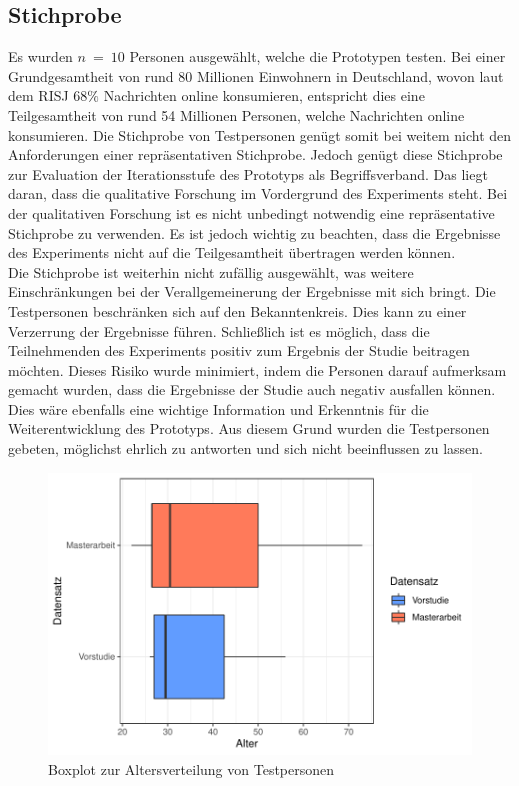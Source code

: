 \subsection{Stichprobe}
Es wurden $n\ =\ 10$ Personen ausgewählt, welche die Prototypen testen.
Bei einer Grundgesamtheit von rund 80 Millionen Einwohnern in Deutschland, wovon laut dem \ac{RISJ} $68\%$ Nachrichten online konsumieren, entspricht dies eine Teilgesamtheit von rund 54 Millionen Personen, welche Nachrichten online konsumieren.
Die Stichprobe von Testpersonen genügt somit bei weitem nicht den Anforderungen einer repräsentativen Stichprobe.
Jedoch genügt diese Stichprobe zur Evaluation der Iterationsstufe des Prototyps als Begriffsverband.
Das liegt daran, dass die qualitative Forschung im Vordergrund des Experiments steht.
Bei der qualitativen Forschung ist es nicht unbedingt notwendig eine repräsentative Stichprobe zu verwenden.
Es ist jedoch wichtig zu beachten, dass die Ergebnisse des Experiments nicht auf die Teilgesamtheit übertragen werden können.\\

Die Stichprobe ist weiterhin nicht zufällig ausgewählt, was weitere Einschränkungen bei der Verallgemeinerung der Ergebnisse mit sich bringt.
Die Testpersonen beschränken sich auf den Bekanntenkreis.
Dies kann zu einer Verzerrung der Ergebnisse führen.
Schließlich ist es möglich, dass die Teilnehmenden des Experiments positiv zum Ergebnis der Studie beitragen möchten.
Dieses Risiko wurde minimiert, indem die Personen darauf aufmerksam gemacht wurden, dass die Ergebnisse der Studie auch negativ ausfallen können.
Dies wäre ebenfalls eine wichtige Information und Erkenntnis für die Weiterentwicklung des Prototyps.
Aus diesem Grund wurden die Testpersonen gebeten, möglichst ehrlich zu antworten und sich nicht beeinflussen zu lassen.\\

\begin{figure}[!ht]
    \centering
    \includegraphics[width=0.9\columnwidth]{figures/boxplot.pdf}
    \caption{\label{fig:age-boxplot}Boxplot zur Altersverteilung von Testpersonen}
\end{figure}

